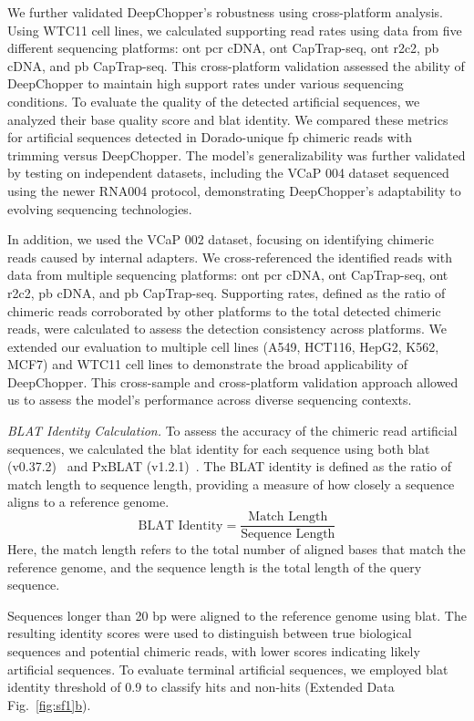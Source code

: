 \documentclass[pdflatex,sn-nature, lineno]{sn-jnl}%
\newcommand{\edfigref}[2]{Extended Data Fig.~\hyperref[#1]{\ref*{#1}#2}}
\theoremstyle{thmstyleone}%
\theoremstyle{thmstyletwo}%
\theoremstyle{thmstylethree}%
\begin{document}
We further validated DeepChopper's robustness using cross-platform analysis.
Using WTC11 cell lines, we calculated supporting read rates using data from five different sequencing platforms: \gls{ont} \gls{pcr} cDNA, \gls{ont} CapTrap-seq, \gls{ont} \gls{r2c2}, \gls{pb} cDNA, and \gls{pb} CapTrap-seq.
This cross-platform validation assessed the ability of DeepChopper to maintain high support rates under various sequencing conditions.
To evaluate the quality of the detected artificial sequences, we analyzed their base quality score and \gls{blat} identity.
We compared these metrics for artificial sequences detected in Dorado-unique \gls{fp} chimeric reads with trimming versus DeepChopper.
The model's generalizability was further validated by testing on independent datasets, including the VCaP 004 dataset sequenced using the newer RNA004 protocol, demonstrating DeepChopper's adaptability to evolving sequencing technologies.

In addition, we used the VCaP 002 dataset, focusing on identifying chimeric reads caused by internal adapters.
We cross-referenced the identified reads with data from multiple sequencing platforms: \gls{ont} \gls{pcr} cDNA, \gls{ont} CapTrap-seq, \gls{ont} \gls{r2c2}, \gls{pb} cDNA, and \gls{pb} CapTrap-seq.
Supporting rates, defined as the ratio of chimeric reads corroborated by other platforms to the total detected chimeric reads, were calculated to assess the detection consistency across platforms.
We extended our evaluation to multiple cell lines (A549, HCT116, HepG2, K562, MCF7) and WTC11 cell lines to demonstrate the broad applicability of DeepChopper.
This cross-sample and cross-platform validation approach allowed us to assess the model's performance across diverse sequencing contexts.

\textit{BLAT Identity Calculation.} To assess the accuracy of the chimeric read artificial sequences, we calculated the \gls{blat} identity for each sequence using both \gls{blat} (v0.37.2)~\cite{kent2002blat} and PxBLAT (v1.2.1)~\cite{li2024pxblat}.
The BLAT identity is defined as the ratio of match length to sequence length, providing a measure of how closely a sequence aligns to a reference genome.
\[
	\textrm{BLAT Identity} = \frac{\textrm{Match Length}}{\textrm{Sequence Length}}
\]
Here, the match length refers to the total number of aligned bases that match the reference genome, and the sequence length is the total length of the query sequence.

Sequences longer than 20 bp were aligned to the reference genome using \gls{blat}.
The resulting identity scores were used to distinguish between true biological sequences and potential chimeric reads, with lower scores indicating likely artificial sequences.
To evaluate terminal artificial sequences, we employed \gls{blat} identity threshold of 0.9 to classify hits and non-hits (\edfigref{fig:sf1}{b}).
\end{document}
